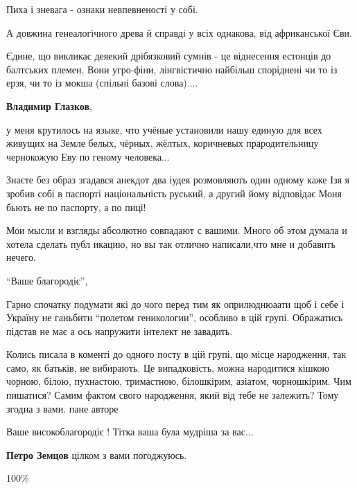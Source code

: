 \begin{itemize}
Пиха і зневага - ознаки невпевненості у собі.

А довжина генеалогічного древа й справді у всіх однакова, від африканської Єви.

Єдине, що викликає деяекий дрібязковий сумнів - це віднесення естонців до
балтських племен. Вони угро-фіни, лінгвістично найбільш споріднені чи то із
ерзя, чи то із мокша (спільні базові слова)....

\begin{itemize} %
\textbf{Владимир Глазков}, 

у меня крутилось на языке, что учёные установили нашу единую для всех живущих
на Земле белых, чёрных, жёлтых, коричневых прародительницу чернокожую Еву по
геному человека...

\end{itemize} %


Знаєте без образ згадався анекдот два іудея розмовляють один одному каже Ізя я
зробив собі в паспорті національність руський, а другий йому відповідає Моня
бьють не по паспорту, а по пиці!


Мои мысли и взгляды абсолютно совпадают с вашими. Много об этом думала и хотела
сделать публ икацию, но вы так отлично написали,что мне и добавить нечего.


\enquote{Ваше благородіє},

Гарно спочатку подумати які до чого перед тим як оприлюднюаати щоб і себе і
Україну не ганьбити \enquote{полетом геникологии}, особливо в цій групі.
Ображатись підстав не має а ось напружити інтелект не завадить.


Колись писала в коменті до одного посту в цій групі, що місце народження, так
само, як батьків, не вибирають. Це випадковість, можна народитися кішкою
чорною, білою, пухнастою, тримастною, білошкірим, азіатом, чорношкірим. Чим
пишатися? Самим фактом свого народження, який від тебе не залежить? Тому згодна
з вами. пане авторе


Ваше високоблагородіє ! Тітка ваша була мудріша за вас...

\textbf{Петро Земцов} цілком з вами погоджуюсь.

100\%



\end{itemize}
